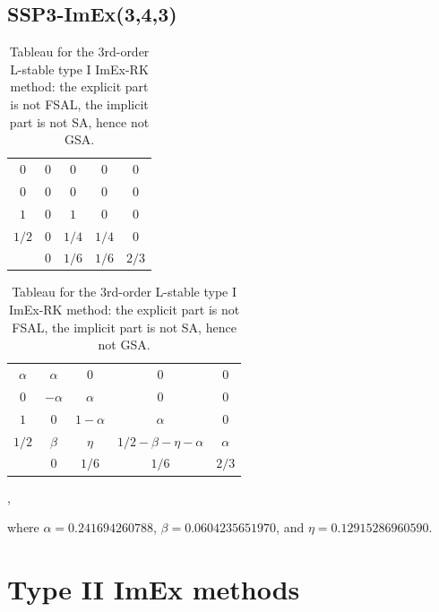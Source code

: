 \documentclass{article}
\begin{document}
\subsection{SSP3-ImEx(3,4,3)}
\begin{table}[H]
\centering
\begin{tabular}{c|cccc}
    $0$ & $0$ & $0$ & $0$ & $0$ \\
    $0$ & $0$ & $0$ & $0$ & $0$ \\
    $1$ & $0$ & $1$ & $0$ & $0$ \\
    $1/2$ & $0$ & $1/4$ & $1/4$ & $0$\\
    \hline
    & $0$ & $1/6$ & $1/6$ & $2/3$ \\
\end{tabular}
\quad
\begin{tabular}{c|cccc}
    $\alpha$ & $\alpha$ & $0$ & $0$ & $0$ \\
    $0$ & $-\alpha$ & $\alpha$ & $0$ & $0$ \\
    $1$ & $0$ & $1-\alpha$ & $\alpha$ & $0$ \\
    $1/2$ & $\beta$ & $\eta$ & $1/2-\beta-\eta-\alpha$ & $\alpha$ \\
    \hline
    & $0$ & $1/6$ & $1/6$ & $2/3$ \\
\end{tabular}\;,
\caption{Tableau for the 3rd-order L-stable type I ImEx-RK method: the explicit part is not FSAL, the
implicit part is not SA, hence not GSA.}
\label{tab:SSP3ImEx343}
\end{table}
where $\alpha = 0.241694260788$, $\beta = 0.0604235651970$,
and $\eta = 0.12915286960590$.

\section{Type II ImEx methods}
\label{app:Tyep_II_ImEx_Methods}
\end{document}
